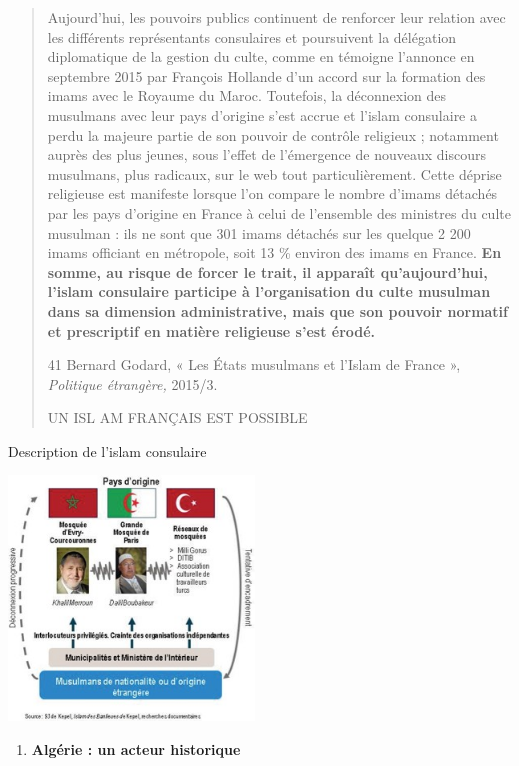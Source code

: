 \begin{quote}
Aujourd'hui, les pouvoirs publics continuent de renforcer leur relation
avec les différents représentants consulaires et poursuivent la
délégation diplomatique de la gestion du culte, comme en témoigne
l'annonce en septembre 2015 par François Hollande d'un accord sur la
formation des imams avec le Royaume du Maroc. Toutefois, la déconnexion
des musulmans avec leur pays d'origine s'est accrue et l'islam
consulaire a perdu la majeure partie de son pouvoir de contrôle
religieux ; notamment auprès des plus jeunes, sous l'effet de
l'émergence de nouveaux discours musulmans, plus radicaux, sur le web
tout particulièrement. Cette déprise religieuse est manifeste lorsque
l'on compare le nombre d'imams détachés par les pays d'origine en France
à celui de l'ensemble des ministres du culte musulman : ils ne sont que
301 imams détachés sur les quelque 2 200 imams officiant en métropole,
soit 13 \% environ des imams en France. \textbf{En somme, au risque de
forcer le trait, il apparaît qu'aujourd'hui, l'islam consulaire
participe à l'organisation du culte musulman dans sa dimension
administrative, mais que son pouvoir normatif et prescriptif en matière
religieuse s'est érodé.}

41 Bernard Godard, « Les États musulmans et l'Islam de France »,
\emph{Politique étrangère,} 2015/3.

UN ISL AM FRANÇAIS EST POSSIBLE
\end{quote}

Description de l'islam consulaire

\includegraphics[width=2.57628in,height=2.55833in]{ImageIslamFrance/media/image7.jpeg}

\begin{enumerate}
\def\labelenumi{\arabic{enumi}.}
\item
  \textbf{Algérie : un acteur historique}
\end{enumerate}

